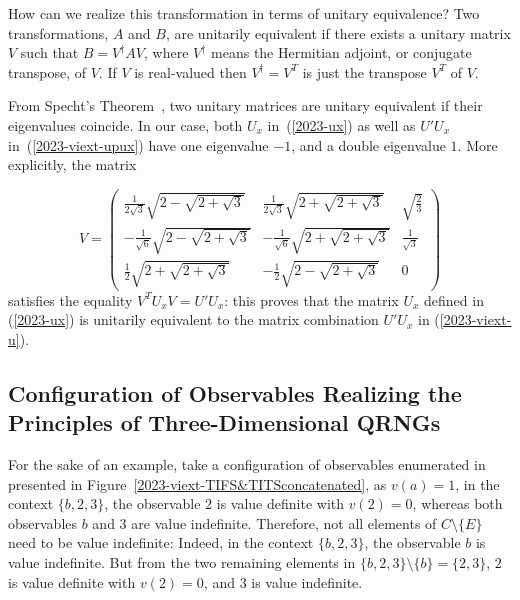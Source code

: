 \documentclass[%
 superscriptaddress,
  preprint,
 showpacs,
 showkeys,
 nofootinbib,
  amsmath,amssymb,
  aps,
 pra,
  longbibliography,
  floatfix,
 ]{revtex4-2}
\theoremstyle{definition}
\begin{document}
How can we realize this transformation in terms of unitary equivalence?
Two transformations, $A$ and $B$, are unitarily equivalent if there exists a unitary matrix $V$ such that $B = V^\dagger AV$, where
$V^\dagger$ means the Hermitian adjoint, or conjugate transpose, of $V$.
If $V$ is real-valued then $V^\dagger =V^T$ is just the transpose $V^T$ of $V$.


From Specht's Theorem~\cite{Horn-Johnson-MatrixAnalysis,Dokovi__2007}, two unitary matrices are unitary equivalent if their eigenvalues coincide.
In our case, both $U_x$ in~(\ref{2023-ux}) as well as $U'U_x$ in~(\ref{2023-viext-upux}) have one eigenvalue $-1$, and a double eigenvalue $1$.
More explicitly, the matrix

\begin{equation*}
V=
\begin{pmatrix}
 \frac{1}{2\sqrt{3}} \sqrt{2-\sqrt{2+\sqrt{3}}}
   & \frac{1}{2\sqrt{3}} \sqrt{2+\sqrt{2+\sqrt{3}}} & \sqrt{\frac{2}{3}} \\
 -\frac{1}{\sqrt{6}}\sqrt{2-\sqrt{2+\sqrt{3}}} &
   -\frac{1}{\sqrt{6}} \sqrt{2+\sqrt{2+\sqrt{3}}} &
   \frac{1}{\sqrt{3}} \\
 \frac{1}{2} \sqrt{2+\sqrt{2+\sqrt{3}}} & -\frac{1}{2}
   \sqrt{2-\sqrt{2+\sqrt{3}}} & 0
\end{pmatrix}
\end{equation*}
satisfies the equality  $V^TU_xV=U'U_x$: this proves
 that the matrix $U_x$ defined in (\ref{2023-ux}) is unitarily equivalent to the matrix combination $U'U_x$ in (\ref{2023-viext-u}).



\subsection{Configuration of Observables Realizing the Principles of Three-Dimensional QRNGs}


For the sake of an example, take a configuration of observables enumerated  in~\cite[Table~I]{2018-minimalYIYS}
presented in Figure~\ref{2023-viext-TIFS&TITSconcatenated},  as $v(a)=1$,
in the context $\{b,2,3\}$, the observable $2$ is value definite with $v(2)=0$, whereas
both observables
$b$ and $3$ are value indefinite.
Therefore, not all elements of $C\setminus \{E\}$ need to be value indefinite:
Indeed, in the context $\{b,2,3\}$, the observable $b$ is value indefinite.
But from the two remaining elements in $\{b,2,3\} \setminus \{b\}=\{2,3\}$,
$2$ is value definite with $v(2)=0$,
and $3$ is value indefinite.
\end{document}
